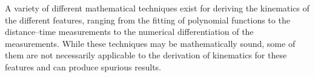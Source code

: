 \documentclass[structabstract]{aa}
\begin{document}
A variety of different mathematical techniques exist for deriving the kinematics of the different features, ranging from the fitting of polynomial functions to the distance--time measurements to the numerical differentiation of the measurements. While these techniques may be mathematically sound, some of them are not necessarily applicable to the derivation of kinematics for these features and can produce spurious results. 



\begin{figure}[!ht]
\centering
{}

\end{figure}
\end{document}

